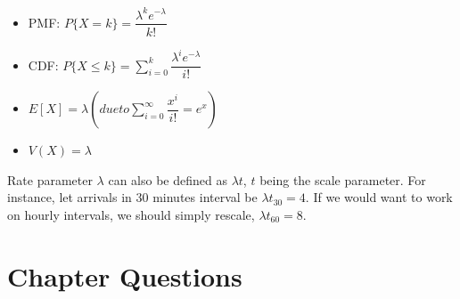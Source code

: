 \documentclass[]{book}
\theoremstyle{definition}
\theoremstyle{definition}
\theoremstyle{definition}
\theoremstyle{remark}
\begin{document}
\begin{itemize}
\item
  PMF: \(P\{X = k\} = \dfrac{\lambda^k e^{-\lambda}}{k!}\)
\item
  CDF:
  \(P\{X \le k\} = \sum_{i=0}^k \dfrac{\lambda^i e^{-\lambda}}{i!}\)
\item
  \(E[X] = \lambda (due to \sum_{i=0}^\infty\dfrac{x^i}{i!} = e^x)\)
\item
  \(V(X) = \lambda\)
\end{itemize}

Rate parameter \(\lambda\) can also be defined as \(\lambda t\), \(t\)
being the scale parameter. For instance, let arrivals in 30 minutes
interval be \(\lambda t_{30} = 4\). If we would want to work on hourly
intervals, we should simply rescale, \(\lambda t_{60} = 8\).

\hypertarget{chapter-questions}{%
\section{Chapter Questions}\label{chapter-questions}}
\end{document}
